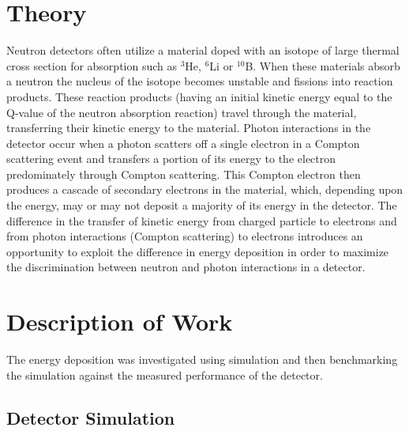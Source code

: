 \documentclass{anstrans}
\newcommand{\iso}[2]{${}^{#2}${#1}}
\begin{document}
\section{Theory}
Neutron detectors often utilize a material doped with an isotope of large thermal cross section for absorption such as \iso{He}{3}, \iso{Li}{6} or \iso{B}{10}. 
When these materials absorb a neutron the nucleus of the isotope becomes unstable and fissions into reaction products.
These reaction products (having an initial kinetic energy equal to the Q-value of the neutron absorption reaction) travel through the material, transferring their kinetic energy to the material.
Photon interactions in the detector occur when a photon scatters off a single electron in a Compton scattering event and transfers a portion of its energy to the electron predominately through Compton scattering.
This Compton electron then produces a cascade of secondary electrons in the material, which, depending upon the energy, may or may not deposit a majority of its energy in the detector.
The difference in the transfer of kinetic energy from charged particle to electrons and from photon interactions (Compton scattering) to electrons introduces an opportunity to exploit the difference in energy deposition in order to maximize the discrimination between neutron and photon interactions in a detector.

\section{Description of Work}
The energy deposition was investigated using simulation and then benchmarking the simulation against the measured performance of the detector.
\subsection{Detector Simulation}
\end{document}
